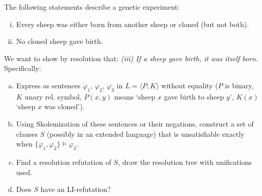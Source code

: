 \begin{problem}

    The following statements describe a genetic experiment:
    \begin{enumerate}[(i)]\it
        \item Every sheep was either born from another sheep or cloned (but not both).
        \item No cloned sheep gave birth.
    \end{enumerate}
    We want to show by resolution that: {\it (iii) If a sheep gave birth, it was itself born.} Specifically:
    \begin{enumerate}[(a)]
        \item Express as sentences $\varphi_1$, $\varphi_2$, $\varphi_3$ in $L=\langle P,K\rangle$ without equality ($P$ is binary, $K$ unary rel. symbol, $P(x,y)$ means `sheep $x$ gave birth to sheep $y$', $K(x)$ `sheep $x$ was cloned').
        \item Using Skolemization of these sentences or their negations, construct a set of clauses $S$ (possibly in an extended language) that is unsatisfiable exactly when $\{\varphi_1, \varphi_2\} \models \varphi_3$.
        \item Find a resolution refutation of $S$, draw the resolution tree with unifications used.
        \item Does $S$ have an LI-refutation?
    \end{enumerate}


\end{problem}
